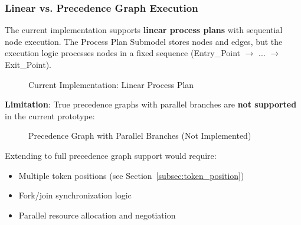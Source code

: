 \subsubsection{Linear vs. Precedence Graph Execution}

The current implementation supports \textbf{linear process plans} with sequential node execution. The Process Plan Submodel stores nodes and edges, but the execution logic processes nodes in a fixed sequence (Entry\_Point $\rightarrow$ ... $\rightarrow$ Exit\_Point).

\begin{figure}[ht]
\centering
{}
\caption{Current Implementation: Linear Process Plan}
\label{fig:linear_plan}
\end{figure}

\textbf{Limitation}: True precedence graphs with parallel branches are \textbf{not supported} in the current prototype:

\begin{figure}[ht]
\centering
{}
\caption{Precedence Graph with Parallel Branches (Not Implemented)}
\label{fig:precedence_graph}
\end{figure}

Extending to full precedence graph support would require:
\begin{itemize}
    \item Multiple token positions (see Section~\ref{subsec:token_position})
    \item Fork/join synchronization logic
    \item Parallel resource allocation and negotiation
\end{itemize}
